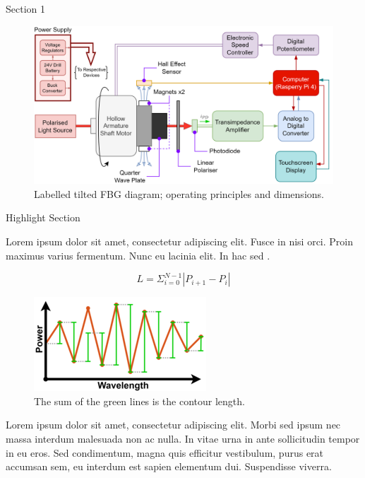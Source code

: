\documentclass[final]{beamer}
\newlength{\onecolwid}
\begin{document}
\begin{frame}[t]
\begin{columns}[t]
\begin{column}{\onecolwid}
\begin{block}{Section 1}
\end{block}

\begin{figure}
\includegraphics[width=1\linewidth]{Images/FunctionalDiagram.png}
\caption{Labelled tilted FBG diagram; operating principles and dimensions.}
\end{figure}


\begin{alertblock}{Highlight Section}

Lorem ipsum dolor sit amet, consectetur adipiscing elit. Fusce in nisi orci. Proin maximus varius fermentum. Nunc eu lacinia elit. In hac sed \cite{Wawrzyk_2022}. 

\begin{equation}
    L = \Sigma_{i=0}^{N-1} |P_{i+1} - P_{i}|
    \label{equ:contlen}
\end{equation}

\begin{figure}
    \includegraphics[width=0.75\linewidth]{Images/calc_contour_length_v2_LQ.png}
    \caption{The sum of the green lines is the contour length.}
\end{figure}

Lorem ipsum dolor sit amet, consectetur adipiscing elit. Morbi sed ipsum nec massa interdum malesuada non ac nulla. In vitae urna in ante sollicitudin tempor in eu eros. Sed condimentum, magna quis efficitur vestibulum, purus erat accumsan sem, eu interdum est sapien elementum dui. Suspendisse viverra.


\end{alertblock}
\end{column}
\end{columns}
\end{frame}
\end{document}
